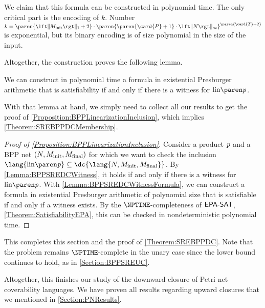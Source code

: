 \documentclass[../../diss.tex]{subfiles}
\begin{document}
We claim that this formula can be constructed in polynomial time.
The only critical part is the encoding of $k$.
Number $k = \paren{\normone{\Minit}+2} \cdot \paren{ \paren{\card{P}+1} \cdot \norminf{N}}^{ \paren{\card{T} + 2} }$ is exponential, but its binary encoding is of size polynomial in the size of the input.

Altogether, the construction proves the following lemma.

\begin{lemma}%
\label{Lemma:BPPSREDCWitnessFormula}%
    We can construct in polynomial time a formula in existential Presburger arithmetic that is satisfiability if and only if there is a witness for $\linof{\product}$.
\end{lemma}

With that lemma at hand, we simply need to collect all our results to get the proof of \cref{Proposition:BPPLinearizationInclusion}, which implies \cref{Theorem:SREBPPDCMembership}.

\begin{proof}[Proof of \cref{Proposition:BPPLinearizationInclusion}]
    Consider a product $\mathit{p}$ and a BPP net $(N,M_{\text{init}},M_{\text{final}})$ for which we want to check the inclusion $\lang{\linof{\product}} \subseteq \dc{\lang{N,\Minit,\Mfinal}}$.
    By \cref{Lemma:BPPSREDCWitness}, it holds if and only if there is a witness for $\linof{\product}$.
    With \cref{Lemma:BPPSREDCWitnessFormula}, we can construct a formula in existential Presburger arithmetic of polynomial size that is satisfiable if and only if a witness exists.
    By the $\NPTIME$-completeness of $\mathsf{EPA\text{-}SAT}$, \cref{Theorem:SatisfiabilityEPA}, this can be checked in nondeterministic polynomial time.
\end{proof}

This completes this section and the proof of \cref{Theorem:SREBPPDC}.
Note that the problem remains $\NPTIME$-complete in the unary case since the lower bound continues to hold, as in \cref{Section:BPPSREUC}.

Altogether, this finishes our study of the downward closure of Petri net coverability languages.
We have proven all results regarding upward closures that we mentioned in \cref{Section:PNResults}.
\end{document}
